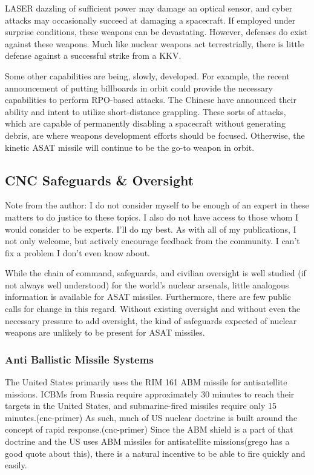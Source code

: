 LASER dazzling of sufficient power may damage an optical sensor, and
cyber attacks may occasionally succeed at damaging a spacecraft.  If
employed under surprise conditions, these weapons can be devastating.
However, defenses do exist against these weapons.  Much like nuclear
weapons act terrestrially, there is little defense against a
successful strike from a KKV.

Some other capabilities are being, slowly, developed.  For example,
the recent announcement of putting billboards in orbit could provide
the necessary capabilities to perform RPO-based attacks.  The Chinese
have announced their ability and intent to utilize short-distance
grappling.  These sorts of attacks, which are capable of permanently
disabling a spacecraft without generating debris, are where weapons
development efforts should be focused.  Otherwise, the kinetic ASAT
missile will continue to be the go-to weapon in orbit.

\subsection{CNC Safeguards \& Oversight}

Note from the author: I do not consider myself to be enough of an
expert in these matters to do justice to these topics.  I also do not
have access to those whom I would consider to be experts.  I'll do my
best.  As with all of my publications, I not only welcome, but
actively encourage feedback from the community.  I can't fix a problem
I don't even know about.

While the chain of command, safeguards, and civilian oversight is well
studied (if not always well understood) for the world's nuclear
arsenals, little analogous information is available for ASAT missiles.
Furthermore, there are few public calls for change in this regard.
Without existing oversight and without even the necessary pressure to
add oversight, the kind of safeguards expected of nuclear weapons are
unlikely to be present for ASAT missiles.

\subsubsection{Anti Ballistic Missile Systems}
The United States primarily uses the RIM 161 ABM missile for
antisatellite missions.  ICBMs from Russia require approximately 30
minutes to reach their targets in the United States, and
submarine-fired missiles require only 15 minutes.(cnc-primer) As such,
much of US nuclear doctrine is built around the concept of rapid
response.(cnc-primer) Since the ABM shield is a part of that doctrine
and the US uses ABM missiles for antisatellite missions(grego has a
good quote about this), there is a natural incentive to be able to
fire quickly and easily.

